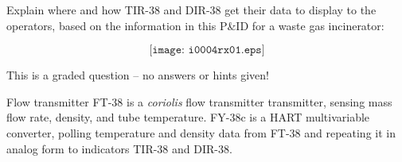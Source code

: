 

Explain where and how TIR-38 and DIR-38 get their data to display to the operators, based on the information in this P\&ID for a waste gas incinerator:

$$\texttt{[image: i0004rx01.eps]}$$

\vfil 

\eject






This is a graded question -- no answers or hints given!
 






Flow transmitter FT-38 is a {\it coriolis} flow transmitter transmitter, sensing mass flow rate, density, and tube temperature.  FY-38c is a HART multivariable converter, polling temperature and density data from FT-38 and repeating it in analog form to indicators TIR-38 and DIR-38.




